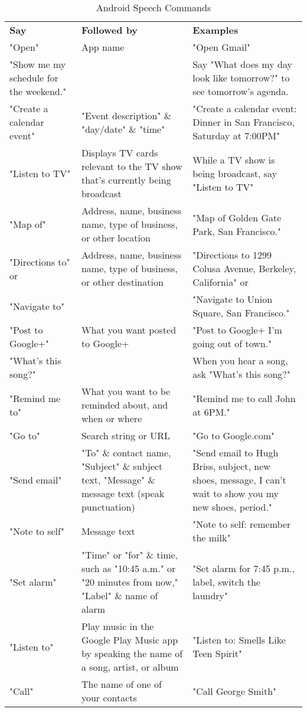 \begin{table}[htbp]
  \centering
  \caption{Android Speech Commands}
  \label{tab:asc}
 \renewcommand{\arraystretch}{1.2}
    \begin{tabularx}{\textwidth}{p{3cm}|X|X}
    \rowcolor{mygray}
    \textbf{Say} & \textbf{Followed by} & \textbf{Examples} \\
    "Open" & App name & "Open Gmail" \\ \hline
   "Show me my schedule for the weekend." &       & Say "What does my day look like tomorrow?" to see tomorrow's agenda. \\ \hline
    "Create a calendar event" & "Event description" \& "day/date" \& "time" & "Create a calendar event: Dinner in San Francisco, Saturday at 7:00PM" \\ \hline
    "Listen to TV" & Displays TV cards relevant to the TV show that's currently being broadcast & While a TV show is being broadcast, say "Listen to TV" \\ \hline
    "Map of" & Address, name, business name, type of business, or other location & "Map of Golden Gate Park, San Francisco." \\ \hline
    "Directions to" or & Address, name, business name, type of business, or other destination & "Directions to 1299 Colusa Avenue, Berkeley, California" or \\ \hline
    "Navigate to" &       & "Navigate to Union Square, San Francisco." \\ \hline
    "Post to Google+" & What you want posted to Google+ & "Post to Google+ I'm going out of town." \\ \hline
    "What's this song?" &       & When you hear a song, ask "What's this song?" \\ \hline
    "Remind me to" & What you want to be reminded about, and when or where & "Remind me to call John at 6PM." \\ \hline
    "Go to" & Search string or URL & "Go to Google.com" \\ \hline
    "Send email" & "To" \& contact name, "Subject" \& subject text, "Message" \& message text (speak punctuation)  & "Send email to Hugh Briss, subject, new shoes, message, I can’t wait to show you my new shoes, period." \\ \hline
    "Note to self" & Message text & "Note to self: remember the milk" \\ \hline
    "Set alarm" & "Time" or "for" \& time, such as "10:45 a.m." or "20 minutes from now," "Label" \& name of alarm & "Set alarm for 7:45 p.m., label, switch the laundry" \\ \hline
    "Listen to" & Play music in the Google Play Music app by speaking the name of a song, artist, or album & "Listen to: Smells Like Teen Spirit" \\ \hline
    "Call" & The name of one of your contacts & "Call George Smith" \\ \end{tabularx}%
\end{table}%
